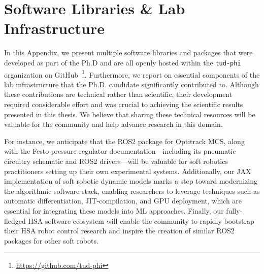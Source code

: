 \chapter{Software Libraries \& Lab Infrastructure}\label{chp:apx:infrastructure}
In this Appendix, we present multiple software libraries and packages that were developed as part of the Ph.D and are all openly hosted within the \texttt{tud-phi} organization on GitHub~\footnote{\url{https://github.com/tud-phi}}. Furthermore, we report on essential components of the lab infrastructure that the Ph.D. candidate significantly contributed to.
Although these contributions are technical rather than scientific, their development required considerable effort and was crucial to achieving the scientific results presented in this thesis. We believe that sharing these technical resources will be valuable for the community and help advance research in this domain.

For instance, we anticipate that the ROS2 package for Optitrack \gls{MCS}, along with the Festo pressure regulator documentation—including its pneumatic circuitry schematic and ROS2 drivers—will be valuable for soft robotics practitioners setting up their own experimental systems. Additionally, our JAX implementation of soft robotic dynamic models marks a step toward modernizing the algorithmic software stack, enabling researchers to leverage techniques such as automatic differentiation, \gls{JIT}-compilation, and \gls{GPU} deployment, which are essential for integrating these models into \gls{ML} approaches. 
Finally, our fully-fledged \gls{HSA} software ecosystem will enable the community to rapidly bootstrap their \gls{HSA} robot control research and inspire the creation of similar ROS2 packages for other soft robots.

